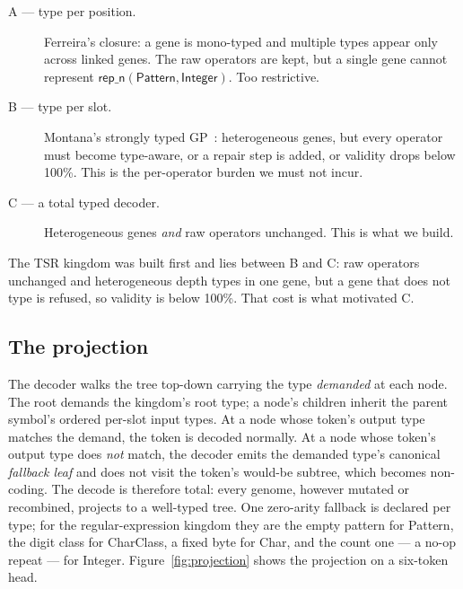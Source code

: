 \documentclass[sigconf,nonacm]{acmart}
\newcommand{\ty}[1]{\textsf{#1}}
\begin{document}
\begin{description}
\item[A --- type per position.] Ferreira's closure: a gene is mono-typed and
multiple types appear only across linked genes. The raw operators are kept, but a
single gene cannot represent $\ty{rep\_n}(\ty{Pattern},\ty{Integer})$. Too
restrictive.
\item[B --- type per slot.] Montana's strongly typed GP~\cite{montana1995stgp}:
heterogeneous genes, but every operator must become type-aware, or a repair step
is added, or validity drops below 100\%. This is the per-operator burden we must
not incur.
\item[C --- a total typed decoder.] Heterogeneous genes \emph{and} raw operators
unchanged. This is what we build.
\end{description}
The TSR kingdom was built first and lies between B and C: raw operators
unchanged and heterogeneous depth types in one gene, but a gene that does not
type is refused, so validity is below 100\%. That cost is what motivated C.

\subsection{The projection}

The decoder walks the tree top-down carrying the type \emph{demanded} at each
node. The root demands the kingdom's root type; a node's children inherit the
parent symbol's ordered per-slot input types. At a node whose token's output type
matches the demand, the token is decoded normally. At a node whose token's output
type does \emph{not} match, the decoder emits the demanded type's canonical
\emph{fallback leaf} and does not visit the token's would-be subtree, which
becomes non-coding. The decode is therefore total: every genome, however mutated
or recombined, projects to a well-typed tree. One zero-arity fallback is declared
per type; for the regular-expression kingdom they are the empty pattern for
\ty{Pattern}, the digit class for \ty{CharClass}, a fixed byte for \ty{Char},
and the count one --- a no-op repeat --- for \ty{Integer}.
Figure~\ref{fig:projection} shows the projection on a six-token head.
\end{document}
